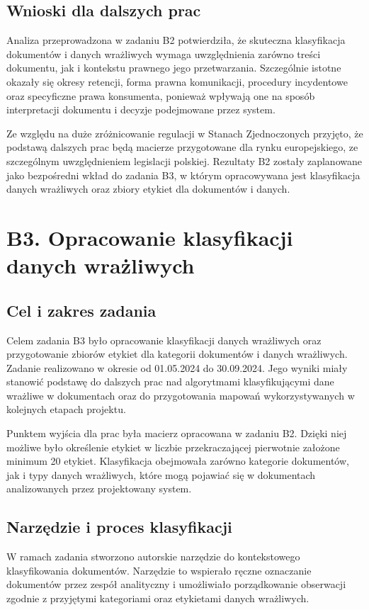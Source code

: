 \documentclass[12pt,a4paper]{report}
\begin{document}
\subsection{Wnioski dla dalszych prac}
Analiza przeprowadzona w zadaniu B2 potwierdziła, że skuteczna klasyfikacja dokumentów i danych wrażliwych wymaga uwzględnienia zarówno treści dokumentu, jak i kontekstu prawnego jego przetwarzania. Szczególnie istotne okazały się okresy retencji, forma prawna komunikacji, procedury incydentowe oraz specyficzne prawa konsumenta, ponieważ wpływają one na sposób interpretacji dokumentu i decyzje podejmowane przez system.

Ze względu na duże zróżnicowanie regulacji w Stanach Zjednoczonych przyjęto, że podstawą dalszych prac będą macierze przygotowane dla rynku europejskiego, ze szczególnym uwzględnieniem legislacji polskiej. Rezultaty B2 zostały zaplanowane jako bezpośredni wkład do zadania B3, w którym opracowywana jest klasyfikacja danych wrażliwych oraz zbiory etykiet dla dokumentów i danych.



\section{B3. Opracowanie klasyfikacji danych wrażliwych}
\subsection{Cel i zakres zadania}
Celem zadania B3 było opracowanie klasyfikacji danych wrażliwych oraz przygotowanie zbiorów etykiet dla kategorii dokumentów i danych wrażliwych. Zadanie realizowano w okresie od 01.05.2024 do 30.09.2024. Jego wyniki miały stanowić podstawę do dalszych prac nad algorytmami klasyfikującymi dane wrażliwe w dokumentach oraz do przygotowania mapowań wykorzystywanych w kolejnych etapach projektu.

Punktem wyjścia dla prac była macierz opracowana w zadaniu B2. Dzięki niej możliwe było określenie etykiet w liczbie przekraczającej pierwotnie założone minimum 20 etykiet. Klasyfikacja obejmowała zarówno kategorie dokumentów, jak i typy danych wrażliwych, które mogą pojawiać się w dokumentach analizowanych przez projektowany system.

\subsection{Narzędzie i proces klasyfikacji}
W ramach zadania stworzono autorskie narzędzie do kontekstowego klasyfikowania dokumentów. Narzędzie to wspierało ręczne oznaczanie dokumentów przez zespół analityczny i umożliwiało porządkowanie obserwacji zgodnie z przyjętymi kategoriami oraz etykietami danych wrażliwych.
\end{document}
